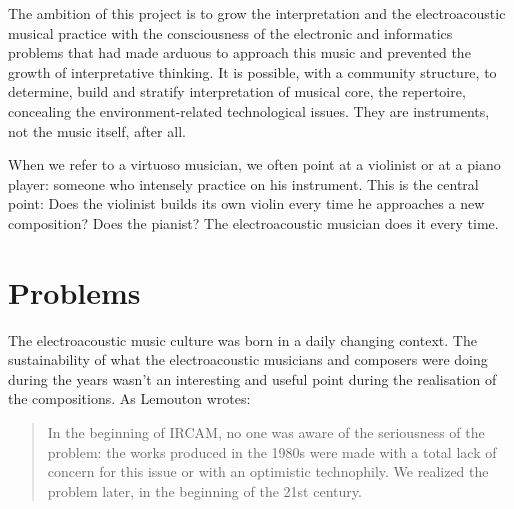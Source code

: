 \documentclass[twoside,a4paper]{article}
\begin{document}
The ambition of this project is to grow the interpretation and the electroacoustic musical practice with the consciousness of the electronic and informatics problems that had made arduous to approach this music and prevented the growth of interpretative thinking. It is possible, with a community structure, to determine, build and stratify interpretation of musical core, the repertoire, concealing the environment-related technological issues. They are instruments, not the music itself, after all.

When we refer to a virtuoso musician, we often point at a violinist or at a piano player: someone who intensely practice on his instrument. This is the central point: Does the violinist builds its own violin every time he approaches a new composition? Does the pianist? The electroacoustic musician does it every time.



\section{Problems}
\label{sec:problems}

The electroacoustic music culture was born in a daily changing context. The sustainability of what the electroacoustic musicians and composers were doing during the years wasn't an interesting and useful point during the realisation of the compositions. As Lemouton wrotes: 

\begin{quote}
In the beginning of IRCAM, no one was aware of the seriousness of the problem: the works produced in the 1980s were made with a total lack of concern for this issue or with an optimistic technophily. We realized the problem later, in the beginning of the 21st century\cite{lem16}.
\end{quote}
\end{document}
